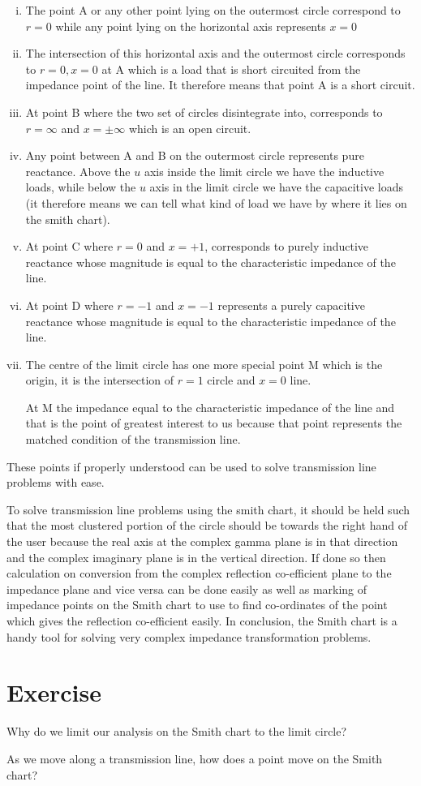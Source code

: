 \begin{enumerate}[(i)]
\item The point A or any other point lying on the outermost circle correspond to $r = 0$ while any point lying on the horizontal axis represents $x = 0$

\item The intersection of this horizontal axis and the outermost circle corresponds to $r = 0,x = 0$ at A which is a load that is short circuited from the impedance point of the line. It therefore means that point A is a short circuit.

\item At point B where the two set of circles disintegrate into, corresponds to $r = \infty$ and $x = \pm\infty $ which is an open circuit.

\item Any point between A and B on the outermost circle represents pure reactance. Above the $u$ axis inside the limit circle we have the inductive loads, while below the $u$ axis in the limit circle we have the capacitive loads (it therefore means we can tell what kind of load we have by where it lies on the smith chart).

\item At point C where $r = 0$ and $x = +1$, corresponds to purely inductive reactance whose magnitude is equal to the characteristic impedance of the line.

\item At point D where $r = -1$ and $x = -1$ represents a purely capacitive reactance whose magnitude is equal to the characteristic impedance of the line.

\item The centre of the limit circle has one more special point M which is the origin, it is the intersection of $r = 1$ circle and $x = 0$ line.

At M the impedance equal to the characteristic impedance of the line and that is the point of greatest interest to us because that point represents the matched condition of the transmission line.
\end{enumerate}
These points if properly understood can be used to solve transmission line problems with ease.

To solve transmission line problems using the smith chart, it should be held such that the most clustered portion of the circle should be towards the right hand of the user because the real axis at the complex gamma plane is in that direction and the complex imaginary plane is in the vertical direction. If done so then calculation on conversion from the complex reflection co-efficient plane to the impedance plane and vice versa can be done easily as well as marking of impedance points on the Smith chart to use to find co-ordinates of the point which gives the reflection co-efficient easily. In conclusion, the Smith chart is a handy tool for solving very complex impedance transformation problems.

\section*{Exercise}
\begin{ExerciseList}
\Exercise[label={ex71}]
Why do we limit our analysis on the Smith chart to the limit circle?

\Exercise[label={ex72}]
As we move along a transmission line, how does a point move on the Smith chart?
\end{ExerciseList}